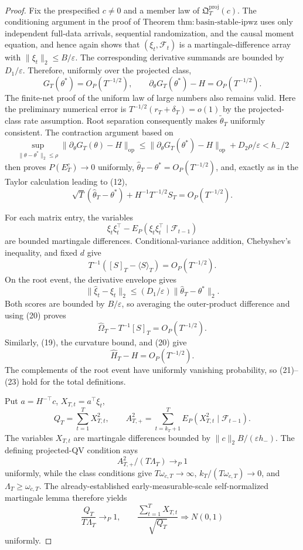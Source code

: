 \documentclass{article}
\begin{document}
\begin{proof}
Fix the prespecified \(c\ne0\) and a member law of \(\mathfrak Q_T^{\mathrm{proj}}(c)\).  The conditioning argument in the proof of Theorem \(\mathrm{thm:basin\text{-}stable\text{-}ipwz}\) uses only independent full-data arrivals, sequential randomization, and the causal moment equation, and hence again shows that \((\xi_t,\mathcal F_t)\) is a martingale-difference array with \(\|\xi_t\|_2\le B/\varepsilon\).  The corresponding derivative summands are bounded by \(D_1/\varepsilon\).  Therefore, uniformly over the projected class,
\[
 G_T(\theta^*)=O_P(T^{-1/2}),
 \qquad
 \partial_\theta G_T(\theta^*)-H=O_P(T^{-1/2}).                            \tag{19}
\]
The finite-net proof of the uniform law of large numbers also remains valid.  Here the preliminary numerical error is \(T^{-1/2}(r_T+\delta_T)=o(1)\) by the projected-class rate assumption.  Root separation consequently makes \(\widetilde\theta_T\) uniformly consistent.  The contraction argument based on
\[
 \sup_{\|\theta-\theta^*\|_2\le\rho}
 \|\partial_\theta G_T(\theta)-H\|_{\mathrm{op}}
 \le \|\partial_\theta G_T(\theta^*)-H\|_{\mathrm{op}}+D_2\rho/\varepsilon
 <h_-/2
\]
then proves \(P(E_T^c)\to0\) uniformly, \(\widehat\theta_T-\theta^*=O_P(T^{-1/2})\), and, exactly as in the Taylor calculation leading to (12),
\[
 \sqrt T(\widehat\theta_T-\theta^*)+H^{-1}T^{-1/2}S_T=O_P(T^{-1/2}).       \tag{20}
\]

For each matrix entry, the variables
\[
 \xi_t\xi_t^\top-E_P(\xi_t\xi_t^\top\mid\mathcal F_{t-1})
\]
are bounded martingale differences.  Conditional-variance addition, Chebyshev's inequality, and fixed \(d\) give
\[
 T^{-1}([S]_T-\langle S\rangle_T)=O_P(T^{-1/2}).                           \tag{21}
\]
On the root event, the derivative envelope gives
\[
 \|\widehat\xi_t-\xi_t\|_2
 \le(D_1/\varepsilon)\|\widehat\theta_T-\theta^*\|_2.
\]
Both scores are bounded by \(B/\varepsilon\), so averaging the outer-product difference and using (20) proves
\[
 \widehat\Omega_T-T^{-1}[S]_T=O_P(T^{-1/2}).                              \tag{22}
\]
Similarly, (19), the curvature bound, and (20) give
\[
 \widehat H_T-H=O_P(T^{-1/2}).                                            \tag{23}
\]
The complements of the root event have uniformly vanishing probability, so (21)--(23) hold for the total definitions.

Put \(a=H^{-\top}c\), \(X_{T,t}=a^\top\xi_t\),
\[
 Q_T=\sum_{t=1}^TX_{T,t}^2,
 \qquad
 A_{T,+}^2=\sum_{t=k_T+1}^TE_P(X_{T,t}^2\mid\mathcal F_{t-1}).
\]
The variables \(X_{T,t}\) are martingale differences bounded by \(\|c\|_2B/(\varepsilon h_-)\).  The defining projected-QV condition says
\[
 A_{T,+}^2/(T\Lambda_T)\to_P1
\]
uniformly, while the class conditions give \(T\omega_{c,T}\to\infty\), \(k_T/(T\omega_{c,T})\to0\), and \(\Lambda_T\ge\omega_{c,T}\).  The already-established early-measurable-scale self-normalized martingale lemma therefore yields
\[
 \frac{Q_T}{T\Lambda_T}\to_P1,
 \qquad
 \frac{\sum_{t=1}^TX_{T,t}}{\sqrt{Q_T}}\Rightarrow N(0,1)                \tag{24}
\]
uniformly.


\end{proof}
\end{document}
